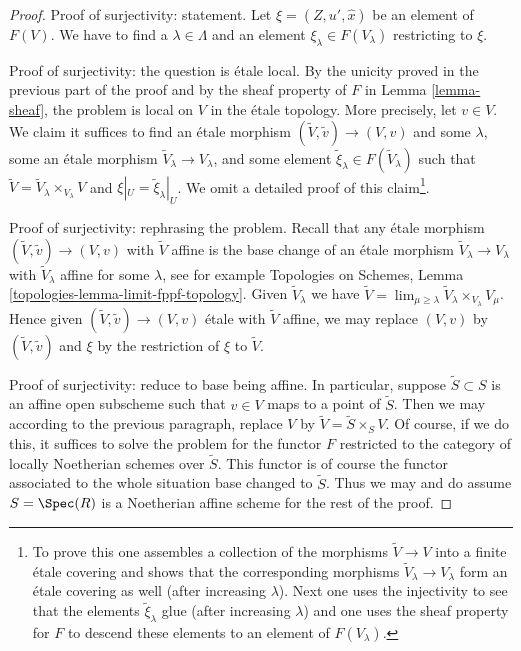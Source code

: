 \begin{proof}
\medskip\noindent
Proof of surjectivity: statement.
Let $\xi = (Z, u', \hat x)$ be an element of $F(V)$.
We have to find a $\lambda \in \Lambda$ and an element
$\xi_\lambda \in F(V_\lambda)$ restricting to $\xi$.

\medskip\noindent
Proof of surjectivity: the question is \'etale local.
By the unicity proved in the previous part of the proof and by the
sheaf property of $F$ in Lemma \ref{lemma-sheaf}, the problem
is local on $V$ in the \'etale topology. More precisely, let $v \in V$.
We claim it suffices to find an \'etale morphism
$(\tilde V, \tilde v) \to (V, v)$ and some
$\lambda$, some an \'etale morphism $\tilde V_\lambda \to V_\lambda$,
and some element $\tilde \xi_\lambda \in F(\tilde V_\lambda)$ such that
$\tilde V = \tilde V_\lambda \times_{V_\lambda} V$
and $\xi|_U = \tilde \xi_\lambda|_U$. We omit a detailed proof of
this claim\footnote{To prove this
one assembles a collection of the morphisms $\tilde V \to V$
into a finite \'etale covering and shows that the corresponding morphisms
$\tilde V_\lambda \to V_\lambda$ form an \'etale covering as well (after
increasing $\lambda$). Next one uses the injectivity to see that
the elements $\tilde \xi_\lambda$ glue (after increasing $\lambda$)
and one uses the sheaf property for $F$ to descend these
elements to an element of $F(V_\lambda)$.}.

\medskip\noindent
Proof of surjectivity: rephrasing the problem.
Recall that any \'etale morphism $(\tilde V, \tilde v) \to (V, v)$
with $\tilde V$ affine is the base change of an \'etale morphism
$\tilde V_\lambda \to V_\lambda$ with $\tilde V_\lambda$ affine
for some $\lambda$, see for example
Topologies on Schemes, Lemma \ref{topologies-lemma-limit-fppf-topology}.
Given $\tilde V_\lambda$ we have
$\tilde V = \lim_{\mu \geq \lambda} \tilde V_\lambda \times_{V_\lambda} V_\mu$.
Hence given $(\tilde V, \tilde v) \to (V, v)$ \'etale with $\tilde V$ affine,
we may replace $(V, v)$ by $(\tilde V, \tilde v)$ and $\xi$ by
the restriction of $\xi$ to $\tilde V$.

\medskip\noindent
Proof of surjectivity: reduce to base being affine. In particular,
suppose $\tilde S \subset S$ is an affine open subscheme such
that $v \in V$ maps to a point of $\tilde S$. Then we may according
to the previous paragraph, replace $V$ by $\tilde V = \tilde S \times_S V$.
Of course, if we do this, it suffices to solve the problem
for the functor $F$ restricted to the category of locally Noetherian
schemes over $\tilde S$. This functor is of course the functor
associated to the whole situation base changed to $\tilde S$.
Thus we may and do assume $S = \Spec(R)$ is a Noetherian affine scheme
for the rest of the proof.


\end{proof}
